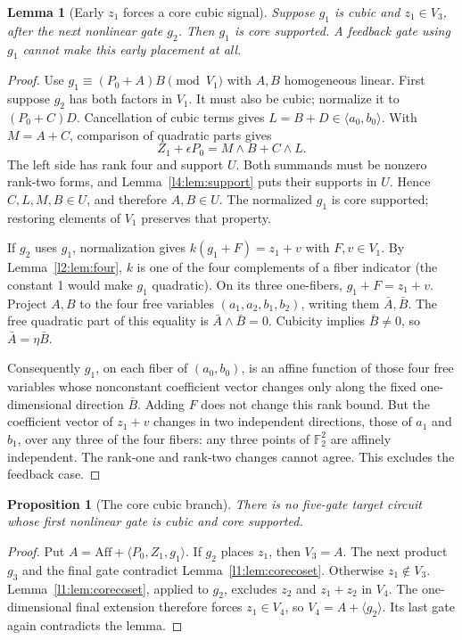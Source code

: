 \documentclass[11pt,a4paper]{article}
\theoremstyle{plain}
\newtheorem{lemma}[theorem]{Lemma}
\newtheorem{proposition}[theorem]{Proposition}
\theoremstyle{remark}
\newcommand{\Aff}{\mathrm{Aff}}
\begin{document}
\begin{lemma}[Early $z_1$ forces a core cubic signal]\label{l1:lem:earlycore}
Suppose $g_1$ is cubic and $z_1\in V_3$, after the next nonlinear gate $g_2$. Then $g_1$ is core supported. A feedback gate using $g_1$ cannot make this early placement at all.
\end{lemma}
\begin{proof}
Use $g_1\equiv(P_0+A)B\pmod{V_1}$ with $A,B$ homogeneous linear. First suppose $g_2$ has both factors in $V_1$. It must also be cubic; normalize it to $(P_0+C)D$. Cancellation of cubic terms gives $L=B+D\in\langle a_0,b_0\rangle$. With $M=A+C$, comparison of quadratic parts gives
\[
Z_1+\epsilon P_0=M\wedge B+C\wedge L.
\]
The left side has rank four and support $U$. Both summands must be nonzero rank-two forms, and Lemma~\ref{l4:lem:support} puts their supports in $U$. Hence $C,L,M,B\in U$, and therefore $A,B\in U$. The normalized $g_1$ is core supported; restoring elements of $V_1$ preserves that property.

If $g_2$ uses $g_1$, normalization gives $k(g_1+F)=z_1+v$ with $F,v\in V_1$. By Lemma~\ref{l2:lem:four}, $k$ is one of the four complements of a fiber indicator (the constant 1 would make $g_1$ quadratic). On its three one-fibers, $g_1+F=z_1+v$. Project $A,B$ to the four free variables $(a_1,a_2,b_1,b_2)$, writing them $\bar A,\bar B$. The free quadratic part of this equality is $\bar A\wedge\bar B=0$. Cubicity implies $\bar B\ne0$, so $\bar A=\eta\bar B$.

Consequently $g_1$, on each fiber of $(a_0,b_0)$, is an affine function of those four free variables whose nonconstant coefficient vector changes only along the fixed one-dimensional direction $\bar B$. Adding $F$ does not change this rank bound. But the coefficient vector of $z_1+v$ changes in two independent directions, those of $a_1$ and $b_1$, over any three of the four fibers: any three points of $\mathbb F_2^2$ are affinely independent. The rank-one and rank-two changes cannot agree. This excludes the feedback case.
\end{proof}

\begin{proposition}[The core cubic branch]\label{l1:prop:corebranch}
There is no five-gate target circuit whose first nonlinear gate is cubic and core supported.
\end{proposition}
\begin{proof}
Put $A=\Aff+\langle P_0,Z_1,g_1\rangle$. If $g_2$ places $z_1$, then $V_3=A$. The next product $g_3$ and the final gate contradict Lemma~\ref{l1:lem:corecoset}. Otherwise $z_1\notin V_3$. Lemma~\ref{l1:lem:corecoset}, applied to $g_2$, excludes $z_2$ and $z_1+z_2$ in $V_4$. The one-dimensional final extension therefore forces $z_1\in V_4$, so $V_4=A+\langle g_2\rangle$. Its last gate again contradicts the lemma.
\end{proof}
\end{document}
